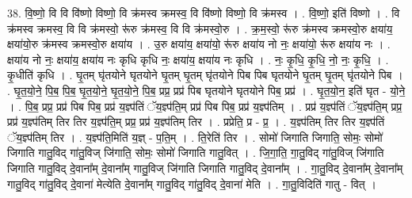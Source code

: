 \documentclass[17pt]{extarticle}
\begin{document}
38. वि॒ष्णो॒ वि वि वि॑ष्णो विष्णो॒ वि क्र॑मस्व क्रमस्व॒ वि वि॑ष्णो विष्णो॒ वि क्र॑मस्व । . वि॒ष्णो॒ इति॑ विष्णो । . वि क्र॑मस्व क्रमस्व॒ वि वि क्र॑मस्वो॒ रू॑रु क्र॑मस्व॒ वि वि क्र॑मस्वो॒रु । . क्र॒म॒स्वो॒ रू॑रु क्र॑मस्व क्रमस्वो॒रु क्षया॑य॒ क्षया॑यो॒रु क्र॑मस्व क्रमस्वो॒रु क्षया॑य । . उ॒रु क्षया॑य॒ क्षया॑यो॒ रू॑रु क्षया॑य नो नः॒ क्षया॑यो॒ रू॑रु क्षया॑य नः । . क्षया॑य नो नः॒ क्षया॑य॒ क्षया॑य नः कृधि कृधि नः॒ क्षया॑य॒ क्षया॑य नः कृधि । . नः॒ कृ॒धि॒ कृ॒धि॒ नो॒ नः॒ कृ॒धि॒ । . कृ॒धीति॑ कृधि । . घृ॒तम् घृ॑तयोने घृतयोने घृ॒तम् घृ॒तम् घृ॑तयोने पिब पिब घृतयोने घृ॒तम् घृ॒तम् घृ॑तयोने पिब । . घृ॒त॒यो॒ने॒ पि॒ब॒ पि॒ब॒ घृ॒त॒यो॒ने॒ घृ॒त॒यो॒ने॒ पि॒ब॒ प्रप्र॒ प्रप्र॑ पिब घृतयोने घृतयोने पिब॒ प्रप्र॑ । . घृ॒त॒यो॒न॒ इति॑ घृत - यो॒ने॒ । . पि॒ब॒ प्रप्र॒ प्रप्र॑ पिब पिब॒ प्रप्र॑ य॒ज्ञ्प॑तिं ॅय॒ज्ञ्प॑ति॒म् प्रप्र॑ पिब पिब॒ प्रप्र॑ य॒ज्ञ्प॑तिम् । . प्रप्र॑ य॒ज्ञ्प॑तिं ॅय॒ज्ञ्प॑ति॒म् प्रप्र॒ प्रप्र॑ य॒ज्ञ्प॑तिम् तिर तिर य॒ज्ञ्प॑ति॒म् प्रप्र॒ प्रप्र॑ य॒ज्ञ्प॑तिम् तिर । . प्रप्रेति॒ प्र - प्र॒ । . य॒ज्ञ्प॑तिम् तिर तिर य॒ज्ञ्प॑तिं ॅय॒ज्ञ्प॑तिम् तिर । . य॒ज्ञ्प॑ति॒मिति॑ य॒ज्ञ् - प॒ति॒म् । . ति॒रेति॑ तिर । . सोमो॑ जिगाति जिगाति॒ सोमः॒ सोमो॑ जिगाति गातु॒विद् गा॑तु॒विज् जि॑गाति॒ सोमः॒ सोमो॑ जिगाति गातु॒वित् । . जि॒गा॒ति॒ गा॒तु॒विद् गा॑तु॒विज् जि॑गाति जिगाति गातु॒विद् दे॒वाना᳚म् दे॒वाना᳚म् गातु॒विज् जि॑गाति जिगाति गातु॒विद् दे॒वाना᳚म् । . गा॒तु॒विद् दे॒वाना᳚म् दे॒वाना᳚म् गातु॒विद् गा॑तु॒विद् दे॒वाना॑ मेत्येति दे॒वाना᳚म् गातु॒विद् गा॑तु॒विद् दे॒वाना॑ मेति । . गा॒तु॒विदिति॑ गातु - वित् । \newline
\pagebreak
{}
\end{document}
